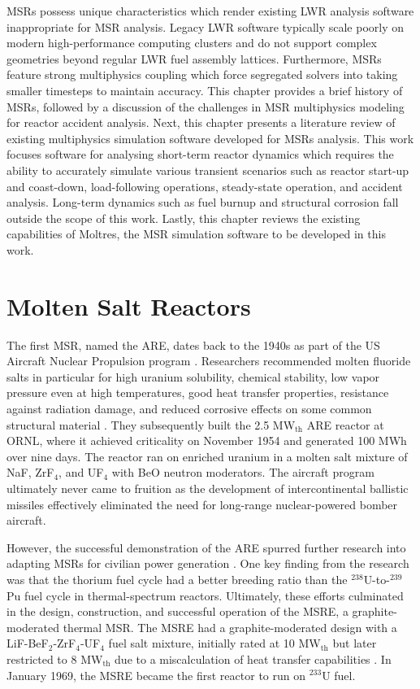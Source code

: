 \glspl{MSR} possess unique characteristics which render existing \gls{LWR}
analysis software inappropriate for \gls{MSR} analysis. Legacy \gls{LWR}
software typically scale poorly on modern high-performance computing
clusters and do not support complex geometries beyond regular \gls{LWR} fuel
assembly lattices. Furthermore, \glspl{MSR} feature strong multiphysics
coupling which force segregated solvers into taking smaller timesteps to
maintain accuracy. This chapter provides a brief history of \glspl{MSR},
followed by a discussion of the challenges in \gls{MSR} multiphysics modeling
for reactor accident analysis. Next, this chapter presents a literature review
of existing multiphysics simulation software developed for \glspl{MSR}
analysis. This work focuses software for analysing short-term reactor dynamics
which requires the ability to accurately simulate various transient scenarios
such as reactor start-up and coast-down, load-following operations,
steady-state operation, and accident analysis. Long-term dynamics such as fuel
burnup and structural corrosion fall outside the scope of this work. Lastly,
this chapter reviews the existing capabilities of Moltres, the MSR simulation
software to be developed in this work.

\section{Molten Salt Reactors}

The first \gls{MSR}, named the \gls{ARE}, dates back to the 1940s
as part of the US Aircraft Nuclear Propulsion program
\cite{rosenthal_molten-salt_1970}. Researchers recommended molten fluoride
salts in particular for high uranium solubility, chemical stability, low vapor
pressure even at high temperatures, good heat transfer properties,
resistance against radiation damage, and reduced corrosive effects on some
common structural material \cite{rosenthal_molten-salt_1970}. They
subsequently built the 2.5 MW$_{\text{th}}$ ARE reactor at \gls{ORNL}, where
it achieved criticality on November 1954 and generated 100 MWh over nine days.
The reactor ran on enriched uranium in a molten salt mixture of NaF,
ZrF$_4$, and UF$_4$ with BeO neutron moderators. The aircraft program
ultimately never came to fruition as the development of intercontinental
ballistic missiles effectively eliminated the need for long-range
nuclear-powered bomber aircraft.

However, the successful demonstration of the \gls{ARE} spurred further
research into adapting \glspl{MSR} for civilian power generation
\cite{rosenthal_molten-salt_1970}. One key finding from the
research was that the thorium fuel cycle had a better breeding ratio than the
$^{238}$U-to-$^{239}$Pu fuel cycle in thermal-spectrum reactors.
Ultimately, these efforts culminated in the design, construction, and
successful operation of the \gls{MSRE}, a graphite-moderated thermal
\gls{MSR}. The \gls{MSRE} had a
graphite-moderated design with a LiF-BeF$_2$-ZrF$_4$-UF$_4$ fuel salt mixture,
initially rated at 10 MW$_{\text{th}}$ but later restricted to 8
MW$_{\text{th}}$ due to a miscalculation of heat transfer capabilities
\cite{haubenreich_experience_1970}. In January 1969, the \gls{MSRE} became the
first reactor to run on $^{233}$U fuel.

